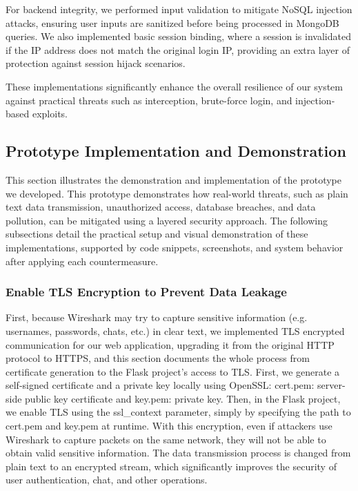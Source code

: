 \documentclass{article}
\begin{document}
For backend integrity, we performed input validation to mitigate NoSQL injection attacks, ensuring user inputs are sanitized before being processed in MongoDB queries. We also implemented basic session binding, where a session is invalidated if the IP address does not match the original login IP, providing an extra layer of protection against session hijack scenarios.

These implementations significantly enhance the overall resilience of our system against practical threats such as interception, brute-force login, and injection-based exploits.

\subsection{Prototype Implementation and Demonstration}
This section illustrates the demonstration and implementation of the prototype we developed. This prototype demonstrates how real-world threats, such as plain text data transmission, unauthorized access, database breaches, and data pollution, can be mitigated using a layered security approach. The following subsections detail the practical setup and visual demonstration of these implementations, supported by code snippets, screenshots, and system behavior after applying each countermeasure.

\subsubsection{Enable TLS Encryption to Prevent Data Leakage }
First, because Wireshark may try to capture sensitive information (e.g. usernames, passwords, chats, etc.) in clear text, we implemented TLS encrypted communication for our web application, upgrading it from the original HTTP protocol to HTTPS, and this section documents the whole process from certificate generation to the Flask project's access to TLS. 
First, we generate a self-signed certificate and a private key locally using OpenSSL: cert.pem: server-side public key certificate and key.pem: private key. Then, in the Flask project, we enable TLS using the ssl\_context parameter, simply by specifying the path to cert.pem and key.pem at runtime. 
With this encryption, even if attackers use Wireshark to capture packets on the same network, they will not be able to obtain valid sensitive information. 
The data transmission process is changed from plain text to an encrypted stream, which significantly improves the security of user authentication, chat, and other operations.
\end{document}
